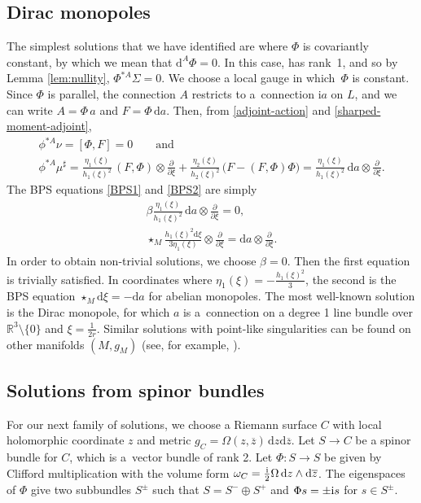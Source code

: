 \documentclass[pdftex]{sigma}
\newcommand{\ii}{{\mathrm{i}}}
\newcommand{\R}{{\mathbb{R}}}
\newcommand{\1}{{\mathbb{1}}}
\newcommand{\bdy}{\partial}
\def \d{\mathrm{d}}
\newcommand{\ol}{\overline}
\numberwithin{equation}{section}
\begin{document}
\subsection{Dirac monopoles}\label{sec:Dirac monopoles}
The simplest solutions that we have identified are where $\Phi$ is covariantly constant, by which we mean that $\d^{A}\Phi=0$. In this case, \smash{$\d^A\phi=\d\xi\frac{\bdy}{\bdy\xi}$} has rank~1, and so by Lemma \ref{lem:nullity}, $\Phi^{\ast A}\Sigma=0$.
We choose a local gauge in which~$\Phi$ is constant.
Since $\Phi$ is parallel, the connection $A$ restricts to a~connection $\ii a$ on $L$, and we can write $A=\Phi\,a$ and $F=\Phi\,\d a$. Then, from \eqref{adjoint-action} and \eqref{sharped-moment-adjoint},
\begin{gather*}
\phi^{\ast A}\nu = [\Phi,F] = 0\qquad\text{and}\\
\phi^{\ast A}\mu^\sharp = \frac{\eta_1(\xi)}{h_1(\xi)^2}\,(F,\Phi)\otimes \frac{\bdy}{\bdy\xi} + \frac{\eta_2(\xi)}{h_2(\xi)^2}\,\bigl(F-(F,\Phi)\Phi\bigr)
= \frac{\eta_1(\xi)}{h_1(\xi)^2}\,\d a\otimes \frac{\bdy}{\bdy\xi}.
\end{gather*}
The BPS equations \eqref{BPS1} and \eqref{BPS2} are simply
\begin{gather*}
\beta \frac{\eta_1(\xi)}{h_1(\xi)^2}\,\d a\otimes \frac{\bdy}{\bdy\xi}=0,\\
\star_{M} \frac{h_1(\xi)^2\d \xi}{3\eta_1(\xi)}\otimes \frac{\bdy}{\bdy\xi} = \d a\otimes \frac{\bdy}{\bdy\xi}.
\end{gather*}
In order to obtain non-trivial solutions, we choose $\beta=0$. Then the first equation is trivially satisfied. In coordinates where $\eta_1(\xi)=-\frac{h_1(\xi)^2}{3}$, the second is the BPS equation $\star_{M}\d \xi=-\d a$ for abelian monopoles. The most well-known solution is the Dirac monopole, for which $a$ is a~connection on a degree 1 line bundle over $\R^3\setminus\{0\}$ and $\xi=\tfrac{1}{2r}$. Similar solutions with point-like singularities can be found on other manifolds $(M,g_M)$ (see, for example, \cite{biswashurtubise2015monopoles}).

\subsection{Solutions from spinor bundles}
\label{sec:spinorial}

For our next family of solutions, we choose a Riemann surface $C$ with local holomorphic coordinate $z$ and metric $g_C=\Omega(z,\ol{z})\,\d z\d\ol{z}$. Let $S\to C$ be a spinor bundle for $C$, which is a~vector bundle of rank 2. Let $\Phi\colon S\to S$ be given by Clifford multiplication with the volume form $\omega_C=\frac{{\rm i}}{2}\Omega\,\d z\wedge \d\ol{z}$. The eigenspaces of $\Phi$ give two subbundles $S^\pm$ such that $S=S^-\oplus S^+$ and $\Phi s=\pm{\rm i} s$ for $s\in S^\pm$.
\end{document}
